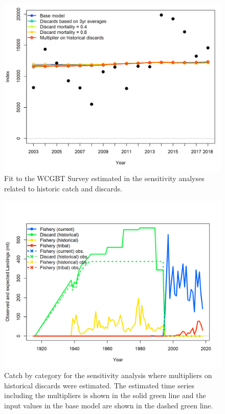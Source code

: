 \documentclass[12pt,]{article}
\begin{document}
\begin{figure}
\centering
\includegraphics{Figures/sens.catch_compare11_indices_flt5.png}
\caption{Fit to the WCGBT Survey estimated in the sensitivity analyses
related to historic catch and discards. \label{fig:Sensitivity_catch2}}
\end{figure}

\begin{figure}
\centering
\includegraphics{Figures/catch_multiplier_catch_comparison.png}
\caption{Catch by category for the sensitivity analysis where
multipliers on historical discards were estimated. The estimated time
series including the multipliers is shown in the solid green line and
the input values in the base model are shown in the dashed green line.
\label{fig:catch_multiplier_catch_comparison}}
\end{figure}
\end{document}
